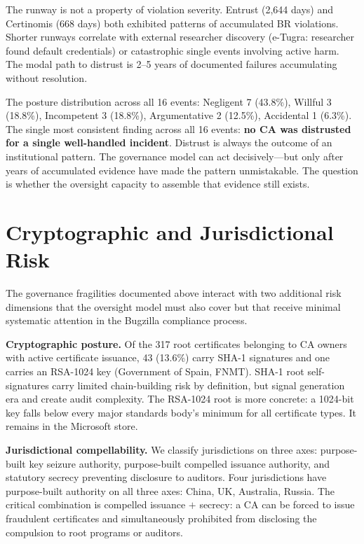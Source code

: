 \documentclass[10pt,twocolumn,letterpaper]{article}
\begin{document}
The runway is not a property of violation severity. Entrust (2,644 days)
and Certinomis (668 days) both exhibited patterns of accumulated BR
violations. Shorter runways correlate with external researcher discovery
(e-Tugra: researcher found default credentials) or catastrophic single
events involving active harm. The modal path to distrust is 2--5 years
of documented failures accumulating without resolution.

The posture distribution across all 16 events: Negligent 7 (43.8\%),
Willful 3 (18.8\%), Incompetent 3 (18.8\%), Argumentative 2 (12.5\%),
Accidental 1 (6.3\%). The single most consistent finding across all 16
events: \textbf{no CA was distrusted for a single well-handled incident}.
Distrust is always the outcome of an institutional pattern. The governance
model can act decisively---but only after years of accumulated evidence
have made the pattern unmistakable. The question is whether the oversight
capacity to assemble that evidence still exists.

\section{Cryptographic and Jurisdictional Risk}
\label{sec:crypto}

The governance fragilities documented above interact with two additional
risk dimensions that the oversight model must also cover but that receive
minimal systematic attention in the Bugzilla compliance process.

\textbf{Cryptographic posture.} Of the 317 root certificates belonging
to CA owners with active certificate issuance, 43
(13.6\%) carry SHA-1 signatures and one carries an RSA-1024 key
(Government of Spain, FNMT). SHA-1 root self-signatures carry limited
chain-building risk by definition, but signal generation era and create
audit complexity. The RSA-1024 root is more concrete: a 1024-bit key
falls below every major standards body's minimum for all certificate
types. It remains in the Microsoft store.

\textbf{Jurisdictional compellability.} We classify jurisdictions on
three axes: purpose-built key seizure authority, purpose-built compelled
issuance authority, and statutory secrecy preventing disclosure to
auditors. Four jurisdictions have purpose-built authority on all three
axes: China, UK, Australia, Russia. The critical combination is compelled
issuance $+$ secrecy: a CA can be forced to issue fraudulent certificates
and simultaneously prohibited from disclosing the compulsion to root
programs or auditors.
\end{document}
